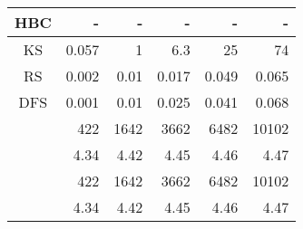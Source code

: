 \begin{table}
\begin{minipage}{172pt}
\begin{center}
\begin{tabular}[c]{| r| r | r | r | r | r |}
\multicolumn{1}{|c||}{HBC} & - & - & - & - & - \\\hline
\multicolumn{1}{|c||}{KS} & 0.057 & 1 & 6.3 & 25 & 74 \\\hline
\multicolumn{1}{|c||}{RS} & 0.002 & 0.01 & 0.017 & 0.049 & 0.065\\\hline
\multicolumn{1}{|c||}{DFS} & 0.001 & 0.01 & 0.025 & 0.041 & 0.068\\\hline
\hline
\multicolumn{1}{|c||}{} & 422 & 1642 & 3662 & 6482 & 10102\\\hline
\multicolumn{1}{|c||}{} & 4.34 & 4.42 & 4.45 & 4.46 & 4.47 \\\hline
\multicolumn{1}{|c||}{} & 422 & 1642 & 3662 & 6482 & 10102\\\hline
\multicolumn{1}{|c||}{} & 4.34 & 4.42 & 4.45 & 4.46 & 4.47 \\\hline
\end{tabular}
\end{center}
\end{minipage}
\end{table} 

